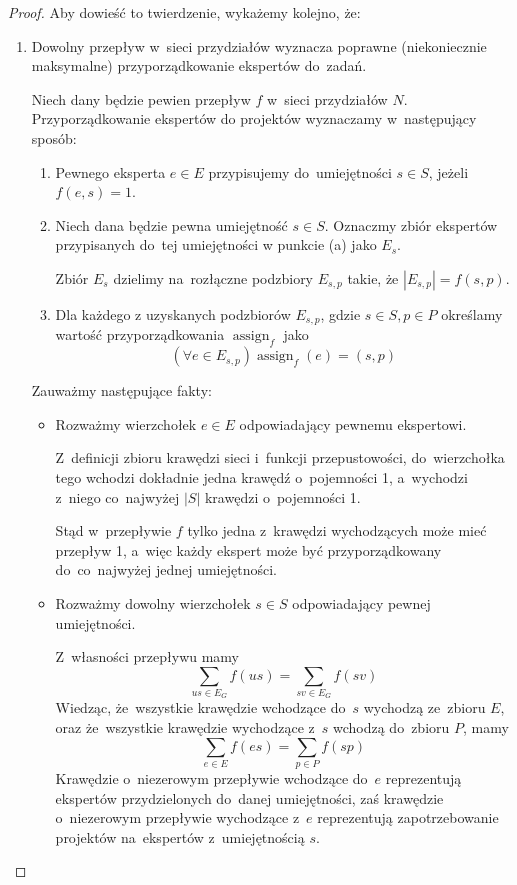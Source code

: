 \documentclass[12pt,a4paper]{article}
\theoremstyle{definition}
\DeclareMathOperator{\assign}{assign}
\begin{document}
\begin{proof}
Aby dowieść to twierdzenie, wykażemy kolejno, że:
\begin{enumerate}
	\item Dowolny przepływ w~sieci przydziałów wyznacza poprawne (niekoniecznie
	maksymalne) przyporządkowanie ekspertów do~zadań.
	
	Niech dany będzie pewien przepływ $f$ w~sieci przydziałów $N$.
	Przyporządkowanie ekspertów do projektów wyznaczamy w~następujący sposób:
	\begin{enumerate}
		\item Pewnego eksperta $e \in E$ przypisujemy do~umiejętności $s \in S$,
		jeżeli $f(e,s) = 1$.
		\item Niech dana będzie pewna umiejętność $s \in S$. Oznaczmy zbiór
		ekspertów przypisanych do~tej umiejętności w punkcie (a) jako $E_s$.

		Zbiór $E_s$ dzielimy na~rozłączne podzbiory $E_{s,p}$ takie, że
		$|E_{s,p}| = f(s,p)$.
		\item Dla każdego z uzyskanych podzbiorów $E_{s,p}$, gdzie
		$s \in S, p \in P$ określamy wartość przyporządkowania $\assign_f$ jako
		$$ (\forall e \in E_{s,p}) \assign_f(e) = (s,p) $$

	\end{enumerate}
	Zauważmy następujące fakty:
	\begin{itemize}
		\item Rozważmy wierzchołek $e \in E$ odpowiadający pewnemu ekspertowi.
		
		Z~definicji zbioru krawędzi sieci i~funkcji przepustowości,
		do~wierzchołka tego wchodzi dokładnie jedna krawędź o~pojemności 1,
		a~wychodzi z~niego co~najwyżej $|S|$ krawędzi o~pojemności 1.

		Stąd w~przepływie $f$ tylko jedna z~krawędzi wychodzących może mieć
		przepływ 1, a~więc każdy ekspert może być przyporządkowany
		do~co~najwyżej jednej umiejętności.
		\item Rozważmy dowolny wierzchołek $s \in S$ odpowiadający pewnej
		umiejętności.

		Z~własności przepływu mamy
		$$ \sum_{us \in E_G} f(us) = \sum_{sv \in E_G} f(sv) $$
		Wiedząc, że~wszystkie krawędzie wchodzące do~$s$ wychodzą ze~zbioru $E$,
		oraz że~wszystkie krawędzie wychodzące z~$s$ wchodzą do~zbioru $P$, mamy
		$$ \sum_{e \in E} f(es) = \sum_{p \in P} f(sp) $$
		Krawędzie o~niezerowym przepływie wchodzące do~$e$ reprezentują
		ekspertów przydzielonych do~danej umiejętności, zaś krawędzie
		o~niezerowym przepływie wychodzące z~$e$ reprezentują zapotrzebowanie
		projektów na~ekspertów z~umiejętnością $s$.


\end{itemize}
\end{enumerate}
\end{proof}
\end{document}
